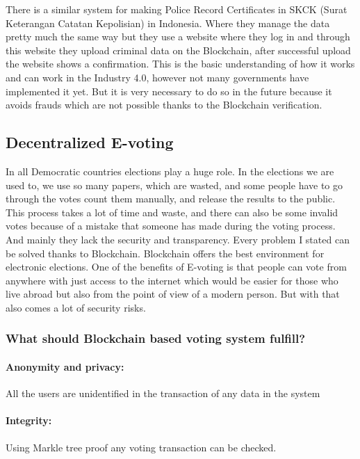 \documentclass[10pt,english,a4paper]{article}
\begin{document}
\cite{Jain:Criminal:record}
There is a similar system for making Police Record Certificates in SKCK (Surat Keterangan Catatan Kepolisian) in Indonesia. Where they manage the data pretty much the same way but they use a website where they log in and through this website they upload criminal data on the Blockchain, after successful upload the website shows a confirmation. This is the basic understanding of how it works and can work in the Industry 4.0, however not many governments have implemented it yet. But it is very necessary to  do so in the future because it avoids frauds which are not possible thanks to the Blockchain verification.
\cite{Suroso:SKCK}

\subsection{Decentralized E-voting}
In all Democratic countries elections play a huge role. In the elections we are used to, we use so many papers, which are wasted, and some people have to go through the votes count them manually, and release the results to the public. This process takes a lot of time and waste, and there can also be some invalid votes because of a mistake that someone has made during the voting process. And mainly they lack the security and transparency. Every problem I stated can be solved thanks to Blockchain. Blockchain offers the best environment for electronic elections. 
\newline
One of the benefits of E-voting is that people can vote from anywhere with just access to the internet which would be easier for those who live abroad but also from the point of view of a modern person. But with that also comes a lot of security risks. \cite{Sharma:E-voting}



\subsubsection{What should Blockchain based voting system fulfill?}

\paragraph{Anonymity and privacy:}
All the users are unidentified in the transaction of any data in the system \cite{Alvi:E-voting}
\paragraph{Integrity:}
Using Markle tree proof any voting transaction can be checked.
\cite{Alvi:E-voting}
\end{document}
